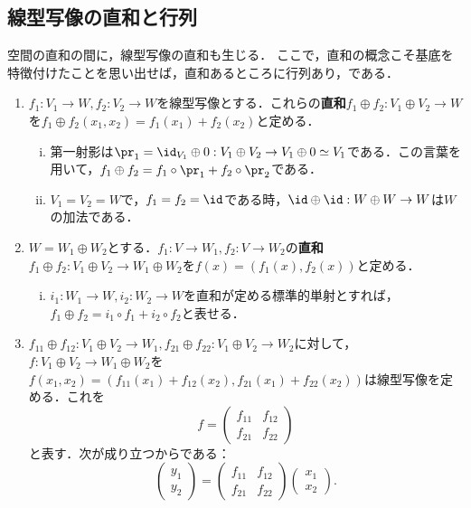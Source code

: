 \documentclass[uplatex, dvipdfmx]{jsreport}
\begin{document}
\subsection{線型写像の直和と行列}

\begin{tcolorbox}[colframe=ForestGreen, colback=ForestGreen!10!white,breakable,colbacktitle=ForestGreen!40!white,coltitle=black,fonttitle=\bfseries\sffamily,
title=]
    空間の直和の間に，線型写像の直和も生じる．
    ここで，直和の概念こそ基底を特徴付けたことを思い出せば，直和あるところに行列あり，である．
\end{tcolorbox}

\begin{definition}[線型写像の直和]\mbox{}
    \begin{enumerate}
        \item $f_1:V_1\to W,f_2:V_2\to W$を線型写像とする．これらの\textbf{直和}$f_1\oplus f_2:V_1\oplus V_2\to W$を$f_1\oplus f_2(x_1,x_2)=f_1(x_1)+f_2(x_2)$と定める．
        \begin{enumerate}[(i)]
            \item 第一射影は$\pr_1=\id_{V_1}\oplus 0:V_1\oplus V_2\to V_1\oplus 0\simeq V_1$である．この言葉を用いて，$f_1\oplus f_2=f_1\circ\pr_1+f_2\circ\pr_2$である．
            \item $V_1=V_2=W$で，$f_1=f_2=\id$である時，$\id\oplus\id:W\oplus W\to W$は$W$の加法である．
        \end{enumerate}
        \item $W=W_1\oplus W_2$とする．$f_1:V\to W_1,f_2:V\to W_2$の\textbf{直和}$f_1\oplus f_2:V_1\oplus V_2\to W_1\oplus W_2$を$f(x)=(f_1(x),f_2(x))$と定める．
        \begin{enumerate}[(i)]
            \item $i_1:W_1\to W,i_2:W_2\to W$を直和が定める標準的単射とすれば，$f_1\oplus f_2=i_1\circ f_1+i_2\circ f_2$と表せる．
        \end{enumerate}
        \item $f_11\oplus f_{12}:V_1\oplus V_2\to W_1,f_{21}\oplus f_{22}:V_1\oplus V_2\to W_2$に対して，$f:V_1\oplus V_2\to W_1\oplus W_2$を$f(x_1,x_2)=(f_{11}(x_1)+f_{12}(x_2),f_{21}(x_1)+f_{22}(x_2))$は線型写像を定める．これを
        \[ f=\begin{pmatrix}f_{11}&f_{12}\\f_{21}&f_{22}\end{pmatrix} \]
        と表す．次が成り立つからである：
        \[ \begin{pmatrix}y_1\\y_2\end{pmatrix}=\begin{pmatrix}f_{11}&f_{12}\\f_{21}&f_{22}\end{pmatrix}\begin{pmatrix}x_1\\x_2\end{pmatrix}. \]

\end{enumerate}
\end{definition}
\end{document}
